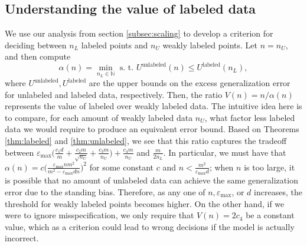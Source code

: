 

\subsection{Understanding the value of labeled data}
We use our analysis from section \ref{subsec:scaling} to develop a criterion for deciding between $n_L$ labeled points and $n_U$ weakly labeled points. Let $n = n_U$, and then compute
\[\alpha(n) = \min_{n_L \in \mathbb{N}} \text{ s. t. } U^{\text{unlabeled}}(n) \leq U^{\text{labeled}}(n_L),\]
where $U^{\text{unlabeled}}, U^{\text{labeled}}$ are the upper bounds on the excess generalization error for unlabeled and labeled data, respectively.
Then, the ratio
$V(n) = {n}/\alpha(n)$
represents the value of labeled over weakly labeled data. The intuitive idea here is to compare, for each amount of weakly labeled data $n_U$, what factor less labeled data we would require to produce an equivalent error bound. 
 Based on Theorems \ref{thm:labeled} and \ref{thm:unlabeled}, we see that this ratio captures the tradeoff between $\varepsilon_{\max} \big(\frac{c_1 d}{m} + \frac{c_2 m}{\sqrt{n_U}} + \frac{c_3 m}{n_U} \big) + \frac{c_4 m}{n_U}$ and $\frac{m}{2n_L}$. In particular, %
we must have that $\alpha(n) = c\big(\frac{\varepsilon_{\max} n m^2}{m^2 - \varepsilon_{\max} d n}\big)^2$ for some constant $c$ and $n < \frac{m^2}{\varepsilon_{\max} d}$; when $n$ is too large, it is possible that no amount of unlabeled data can achieve the same generalization error due to the standing bias. Therefore, as any  one of $n, \varepsilon_{\max}$, or $d$ increases, the threshold for weakly labeled points becomes higher. On the other hand, if we were to ignore misspecification, we only require that $V(n) = 2c_4$ be a constant value, which as a criterion could lead to wrong decisions if the model is actually incorrect.
